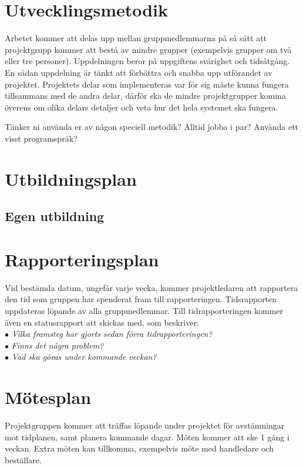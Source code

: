 \documentclass[11pt]{article}
\begin{document}
\begin{flushleft}
\begin{center}
\begin{longtable}{|p{.24\linewidth}|p{.08\linewidth}|p{.25\linewidth}|p{.19\linewidth}|p{.15\linewidth}|}
\end{longtable}
\end{center}
\pagebreak

\section{Utvecklingsmetodik}
Arbetet kommer att delas upp mellan gruppmedlemmarna på så sätt att projektgrupp kommer att bestå av mindre grupper (exempelvis grupper om två eller tre personer). Uppdelningen beror på uppgiftens svårighet och tidsåtgång. En sådan uppdelning är tänkt att förbättra och snabba upp utförandet av projektet. Projektets delar som implementeras var för sig måste kunna fungera tillsammans med de andra delar, därför ska de mindre projektgrupper komma överens om olika delars detaljer och veta hur det hela systemet ska fungera.

Tänker ni använda er av någon speciell metodik?
Alltid jobba i par? Använda ett visst
programspråk?


\pagebreak

\section{Utbildningsplan}


\subsection{Egen utbildning}


\pagebreak

\section{Rapporteringsplan}
Vid bestämda datum, ungefär varje vecka, kommer projektledaren att rapportera den tid som gruppen har spenderat fram till rapporteringen. Tidsrapporten uppdateras löpande av alla gruppmedlemmar. Till tidrapporteringen kommer även en statusrapport att skickas med, som beskriver:\\
$\bullet$ \textit{Vilka framsteg har gjorts sedan förra tidrapporteringen?}\\
$\bullet$ \textit{Finns det några problem?}\\ 
$\bullet$ \textit{Vad ska göras under kommande veckan?}


\section{Mötesplan}
Projektgruppen kommer att träffas löpande under projektet för avstämningar mot tidplanen, samt planera kommande dagar. Möten kommer att ske 1 gång i veckan. Extra möten kan tillkomma, exempelvis möte med handledare och beställare.



\end{flushleft}
\end{document}
